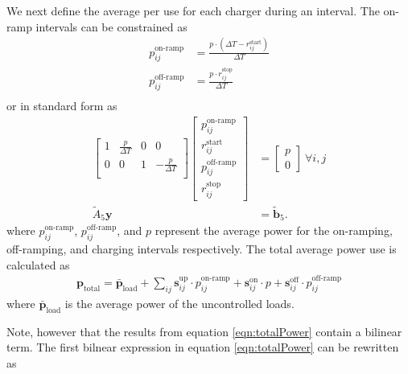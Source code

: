 \par We next define the average per use for each charger during an interval. The on-ramp intervals can be constrained as
\begin{equation}\begin{aligned}
	p^{\text{on-ramp}}_{ij} &= \frac{p\cdot (\Delta T - r^{\text{start}}_{ij})}{\Delta T}\\
	p^{\text{off-ramp}}_{ij} &= \frac{p\cdot r^{\text{stop}}_{ij}}{\Delta T}\\
\end{aligned}\end{equation}
or in standard form as
\begin{equation}\begin{aligned}
	\begin{bmatrix} 1 & \frac{p}{\Delta T} & 0 & 0                   \\
		        0 & 0                  & 1 & -\frac{p}{\Delta T} \\
	\end{bmatrix}
	\begin{bmatrix} p^{\text{on-ramp}}_{ij}  \\
		        r_{ij}^{\text{start}}    \\
			p^{\text{off-ramp}}_{ij} \\ 
			r^{\text{stop}}_{ij} 
	\end{bmatrix} &=
	\begin{bmatrix} p \\
	                0
	\end{bmatrix} \ \forall i,j \\
	\tilde{A}_5\mathbf{y} &= \tilde{\mathbf{b}}_5.
\end{aligned}\end{equation}
where $p_{ij}^{\text{on-ramp}}$, $p_{ij}^{\text{off-ramp}}$, and $p$ represent the average power for the on-ramping, off-ramping, and charging intervals respectively. The total average power use is calculated as 
\begin{align}\label{eqn:totalPower}
	\mathbf{p}_{\text{total}} = \bar{\mathbf{p}}_{\text{load}} + \sum_{ij} \mathbf{s}^{\text{up}}_{ij}\cdot p^{\text{on-ramp}}_{ij} + \mathbf{s}^{\text{on}}_{ij}\cdot p + \mathbf{s}^{\text{off}}_{ij}\cdot p^{\text{off-ramp}}_{ij}
\end{align}
where $\bar{\mathbf{p}}_{\text{load}}$ is the average power of the uncontrolled loads.
\par Note, however that the results from equation \ref{eqn:totalPower} contain a bilinear term. The first bilnear expression in  equation \ref{eqn:totalPower} can be rewritten as 
